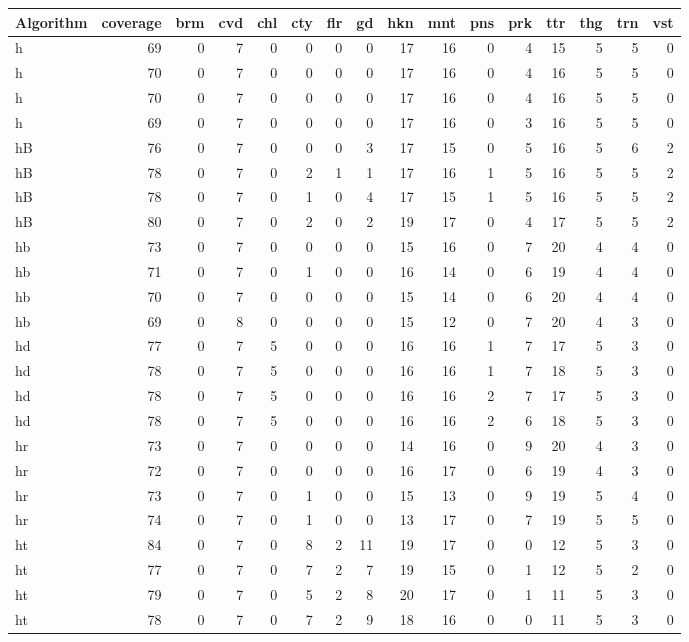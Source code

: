 \begin{center}
\begin{tabular}{lrrrrrrrrrrrrrrr}
Algorithm & coverage & brm & cvd & chl & cty & flr & gd & hkn & mnt & pns & prk & ttr & thg & trn & vst\\
\hline
h & 69 & 0 & 7 & 0 & 0 & 0 & 0 & 17 & 16 & 0 & 4 & 15 & 5 & 5 & 0\\
h & 70 & 0 & 7 & 0 & 0 & 0 & 0 & 17 & 16 & 0 & 4 & 16 & 5 & 5 & 0\\
h & 70 & 0 & 7 & 0 & 0 & 0 & 0 & 17 & 16 & 0 & 4 & 16 & 5 & 5 & 0\\
h & 69 & 0 & 7 & 0 & 0 & 0 & 0 & 17 & 16 & 0 & 3 & 16 & 5 & 5 & 0\\
hB & 76 & 0 & 7 & 0 & 0 & 0 & 3 & 17 & 15 & 0 & 5 & 16 & 5 & 6 & 2\\
hB & 78 & 0 & 7 & 0 & 2 & 1 & 1 & 17 & 16 & 1 & 5 & 16 & 5 & 5 & 2\\
hB & 78 & 0 & 7 & 0 & 1 & 0 & 4 & 17 & 15 & 1 & 5 & 16 & 5 & 5 & 2\\
hB & 80 & 0 & 7 & 0 & 2 & 0 & 2 & 19 & 17 & 0 & 4 & 17 & 5 & 5 & 2\\
hb & 73 & 0 & 7 & 0 & 0 & 0 & 0 & 15 & 16 & 0 & 7 & 20 & 4 & 4 & 0\\
hb & 71 & 0 & 7 & 0 & 1 & 0 & 0 & 16 & 14 & 0 & 6 & 19 & 4 & 4 & 0\\
hb & 70 & 0 & 7 & 0 & 0 & 0 & 0 & 15 & 14 & 0 & 6 & 20 & 4 & 4 & 0\\
hb & 69 & 0 & 8 & 0 & 0 & 0 & 0 & 15 & 12 & 0 & 7 & 20 & 4 & 3 & 0\\
hd & 77 & 0 & 7 & 5 & 0 & 0 & 0 & 16 & 16 & 1 & 7 & 17 & 5 & 3 & 0\\
hd & 78 & 0 & 7 & 5 & 0 & 0 & 0 & 16 & 16 & 1 & 7 & 18 & 5 & 3 & 0\\
hd & 78 & 0 & 7 & 5 & 0 & 0 & 0 & 16 & 16 & 2 & 7 & 17 & 5 & 3 & 0\\
hd & 78 & 0 & 7 & 5 & 0 & 0 & 0 & 16 & 16 & 2 & 6 & 18 & 5 & 3 & 0\\
hr & 73 & 0 & 7 & 0 & 0 & 0 & 0 & 14 & 16 & 0 & 9 & 20 & 4 & 3 & 0\\
hr & 72 & 0 & 7 & 0 & 0 & 0 & 0 & 16 & 17 & 0 & 6 & 19 & 4 & 3 & 0\\
hr & 73 & 0 & 7 & 0 & 1 & 0 & 0 & 15 & 13 & 0 & 9 & 19 & 5 & 4 & 0\\
hr & 74 & 0 & 7 & 0 & 1 & 0 & 0 & 13 & 17 & 0 & 7 & 19 & 5 & 5 & 0\\
ht & 84 & 0 & 7 & 0 & 8 & 2 & 11 & 19 & 17 & 0 & 0 & 12 & 5 & 3 & 0\\
ht & 77 & 0 & 7 & 0 & 7 & 2 & 7 & 19 & 15 & 0 & 1 & 12 & 5 & 2 & 0\\
ht & 79 & 0 & 7 & 0 & 5 & 2 & 8 & 20 & 17 & 0 & 1 & 11 & 5 & 3 & 0\\
ht & 78 & 0 & 7 & 0 & 7 & 2 & 9 & 18 & 16 & 0 & 0 & 11 & 5 & 3 & 0\\
\end{tabular}
\end{center}


